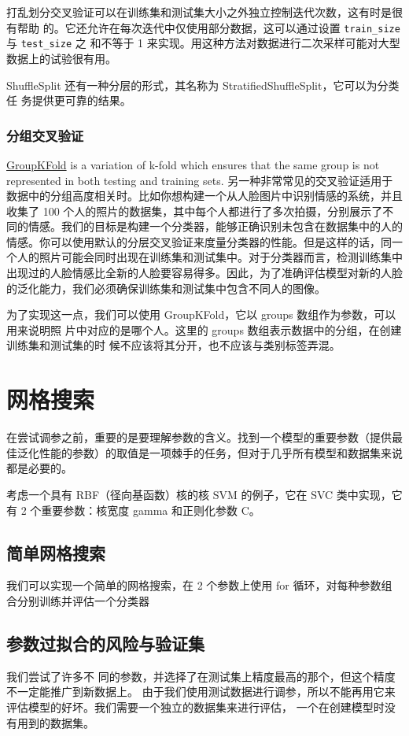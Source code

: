 打乱划分交叉验证可以在训练集和测试集大小之外独立控制迭代次数，这有时是很有帮助
的。它还允许在每次迭代中仅使用部分数据，这可以通过设置 \verb|train_size| 与 \verb|test_size| 之
和不等于 1 来实现。用这种方法对数据进行二次采样可能对大型数据上的试验很有用。

ShuffleSplit 还有一种分层的形式，其名称为 StratifiedShuffleSplit，它可以为分类任
务提供更可靠的结果。

\subsubsection{分组交叉验证}
\href{https://scikit-learn.org/stable/modules/cross_validation.html#group-k-fold}{GroupKFold} is a variation of k-fold which ensures that the same group is not represented in both testing and training sets.
另一种非常常见的交叉验证适用于数据中的分组高度相关时。比如你想构建一个从人脸图片中识别情感的系统，并且收集了 100 个人的照片的数据集，其中每个人都进行了多次拍摄，分别展示了不同的情感。我们的目标是构建一个分类器，能够正确识别未包含在数据集中的人的情感。你可以使用默认的分层交叉验证来度量分类器的性能。但是这样的话，同一个人的照片可能会同时出现在训练集和测试集中。对于分类器而言，检测训练集中出现过的人脸情感比全新的人脸要容易得多。因此，为了准确评估模型对新的人脸的泛化能力，我们必须确保训练集和测试集中包含不同人的图像。

为了实现这一点，我们可以使用 GroupKFold，它以 groups 数组作为参数，可以用来说明照
片中对应的是哪个人。这里的 groups 数组表示数据中的分组，在创建训练集和测试集的时
候不应该将其分开，也不应该与类别标签弄混。

\section{网格搜索}
在尝试调参之前，重要的是要理解参数的含义。找到一个模型的重要参数（提供最佳泛化性能的参数）的取值是一项棘手的任务，但对于几乎所有模型和数据集来说都是必要的。

考虑一个具有 RBF（径向基函数）核的核 SVM 的例子，它在 SVC 类中实现，它有 2 个重要参数：核宽度 gamma 和正则化参数 C。
\subsection{简单网格搜索}

我们可以实现一个简单的网格搜索，在 2 个参数上使用 for 循环，对每种参数组合分别训练并评估一个分类器
\subsection{参数过拟合的风险与验证集}
我们尝试了许多不
同的参数，并选择了在测试集上精度最高的那个，但这个精度不一定能推广到新数据上。
由于我们使用测试数据进行调参，所以不能再用它来评估模型的好坏。我们需要一个独立的数据集来进行评估，
一个在创建模型时没有用到的数据集。

